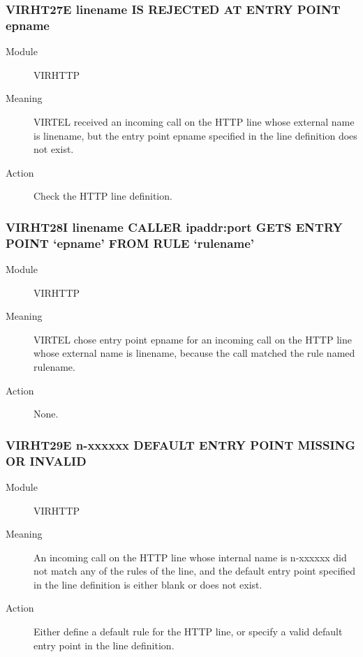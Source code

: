 \documentclass[letterpaper,10pt,english]{sphinxmanual}
\begin{document}
\subsubsection{VIRHT27E linename IS REJECTED AT ENTRY POINT epname}
\label{\detokenize{messages:virht27e-linename-is-rejected-at-entry-point-epname}}\begin{description}
\item[{Module}] \leavevmode
VIRHTTP

\item[{Meaning}] \leavevmode
VIRTEL received an incoming call on the HTTP line whose external name is linename, but the entry point epname specified in the line definition does not exist.

\item[{Action}] \leavevmode
Check the HTTP line definition.

\end{description}


\subsubsection{VIRHT28I linename CALLER ipaddr:port GETS ENTRY POINT ‘epname’ FROM RULE ‘rulename’}
\label{\detokenize{messages:virht28i-linename-caller-ipaddr-port-gets-entry-point-epname-from-rule-rulename}}\begin{description}
\item[{Module}] \leavevmode
VIRHTTP

\item[{Meaning}] \leavevmode
VIRTEL chose entry point epname for an incoming call on the HTTP line whose external name is linename, because the call matched the rule named rulename.

\item[{Action}] \leavevmode
None.

\end{description}


\subsubsection{VIRHT29E n-xxxxxx DEFAULT ENTRY POINT MISSING OR INVALID}
\label{\detokenize{messages:virht29e-n-xxxxxx-default-entry-point-missing-or-invalid}}\begin{description}
\item[{Module}] \leavevmode
VIRHTTP

\item[{Meaning}] \leavevmode
An incoming call on the HTTP line whose internal name is n-xxxxxx did not match any of the rules of the line, and the default entry point specified in the line definition is either blank or does not exist.

\item[{Action}] \leavevmode
Either define a default rule for the HTTP line, or specify a valid default entry point in the line definition.

\end{description}
\end{document}
